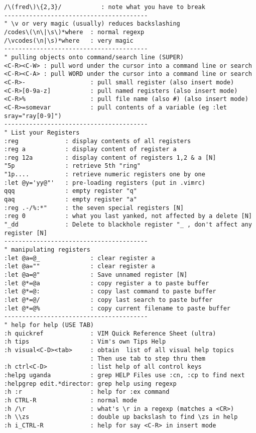 \documentclass[10pt,landscape]{article}
\begin{document}
\begin{multicols}{2}
\begin{verbatim}
/\(fred\)\{2,3}/           : note what you have to break
----------------------------------------
" \v or very magic (usually) reduces backslashing
/codes\(\n\|\s\)*where  : normal regexp
/\vcodes(\n|\s)*where   : very magic
----------------------------------------
" pulling objects onto command/search line (SUPER)
<C-R><C-W> : pull word under the cursor into a command line or search
<C-R><C-A> : pull WORD under the cursor into a command line or search
<C-R>-                  : pull small register (also insert mode)
<C-R>[0-9a-z]           : pull named registers (also insert mode)
<C-R>%                  : pull file name (also #) (also insert mode)
<C-R>=somevar           : pull contents of a variable (eg :let sray="ray[0-9]")
----------------------------------------
" List your Registers
:reg             : display contents of all registers
:reg a           : display content of register a
:reg 12a         : display content of registers 1,2 & a [N]
"5p              : retrieve 5th "ring" 
"1p....          : retrieve numeric registers one by one
:let @y='yy@"'   : pre-loading registers (put in .vimrc)
qqq              : empty register "q"
qaq              : empty register "a"
:reg .-/%:*"     : the seven special registers [N]
:reg 0           : what you last yanked, not affected by a delete [N]
"_dd             : Delete to blackhole register "_ , don't affect any register [N]
----------------------------------------
" manipulating registers
:let @a=@_              : clear register a
:let @a=""              : clear register a
:let @a=@"              : Save unnamed register [N]
:let @*=@a              : copy register a to paste buffer
:let @*=@:              : copy last command to paste buffer
:let @*=@/              : copy last search to paste buffer
:let @*=@%              : copy current filename to paste buffer
----------------------------------------
" help for help (USE TAB)
:h quickref             : VIM Quick Reference Sheet (ultra)
:h tips                 : Vim's own Tips Help
:h visual<C-D><tab>     : obtain  list of all visual help topics
                        : Then use tab to step thru them
:h ctrl<C-D>            : list help of all control keys
:helpg uganda           : grep HELP Files use :cn, :cp to find next
:helpgrep edit.*director: grep help using regexp
:h :r                   : help for :ex command
:h CTRL-R               : normal mode
:h /\r                  : what's \r in a regexp (matches a <CR>)
:h \\zs                 : double up backslash to find \zs in help
:h i_CTRL-R             : help for say <C-R> in insert mode

\end{verbatim}
\end{multicols}
\end{document}
